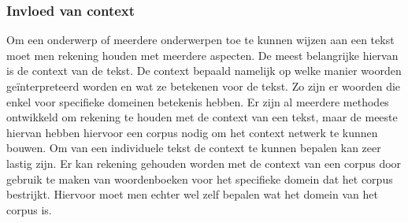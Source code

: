 \subsubsection{Invloed van context}
Om een onderwerp of meerdere onderwerpen toe te kunnen wijzen aan een tekst moet men rekening houden met meerdere aspecten. De meest belangrijke hiervan is de context van de tekst. De context bepaald namelijk op welke manier woorden geïnterpreteerd worden en wat ze betekenen voor de tekst. Zo zijn er woorden die enkel voor specifieke domeinen betekenis hebben. Er zijn al meerdere methodes ontwikkeld om rekening te houden met de context van een tekst, maar de meeste hiervan hebben hiervoor een corpus nodig om het context netwerk te kunnen bouwen. Om van een individuele tekst de context te kunnen bepalen kan zeer lastig zijn. Er kan rekening gehouden worden met de context van een corpus door gebruik te maken van woordenboeken voor het specifieke domein dat het corpus bestrijkt. Hiervoor moet men echter wel zelf bepalen wat het domein van het corpus is. \citep{aggarwal2012survey}